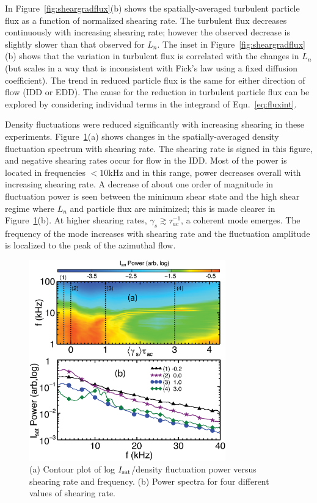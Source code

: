 \documentclass[aip,pop,amsmath,amssymb,preprint,superscriptaddress]{revtex4-1} %
\begin{document}
In Figure~\ref{fig:sheargradflux}(b) shows the spatially-averaged turbulent
particle flux as a function of normalized shearing rate.  The
turbulent flux decreases continuously with increasing shearing rate;
however the observed decrease is slightly slower than that observed
for $L_n$.  The inset in Figure~\ref{fig:sheargradflux}(b) shows that the variation in
turbulent flux is correlated with the changes in $L_n$ (but scales in a way
that is inconsistent with Fick's law using a fixed diffusion coefficient).  The
trend in reduced particle flux is the same for either direction of
flow (IDD or EDD).  The cause for the reduction in turbulent particle
flux can be explored by considering individual terms in the integrand
of Eqn.~\ref{eq:fluxint}.

Density fluctuations were reduced significantly with increasing
shearing in these experiments.  Figure~\ref{fig:powercontour}(a) shows
changes in the spatially-averaged density fluctuation spectrum
with shearing rate.  The shearing rate is signed in this figure, and
negative shearing rates occur for flow in the IDD. Most of the power
is located in frequencies $<10$kHz and in this range, power decreases
overall with increasing shearing rate.  A decrease of about one order
of magnitude in fluctuation power is seen between the minimum shear
state and the high shear regime where $L_n$ and particle flux are
minimized; this is made clearer in Figure~\ref{fig:powercontour}(b).  At
higher shearing rates, $\gamma_{s} \gtrsim \tau_{ac}^{-1}$, a coherent
mode emerges.  The frequency of the mode increases with shearing rate
and the fluctuation amplitude is localized to the peak of the
azimuthal flow.

\begin{figure}[!htbp]
\centerline{
\includegraphics[width=8.5cm]{figure4.eps}}
\caption{\label{fig:powercontour} (a) Contour plot of log $I_{\rm sat}$/density fluctuation power versus shearing rate and frequency. (b) Power spectra for four different values of shearing rate.}
\end{figure}
\end{document}
